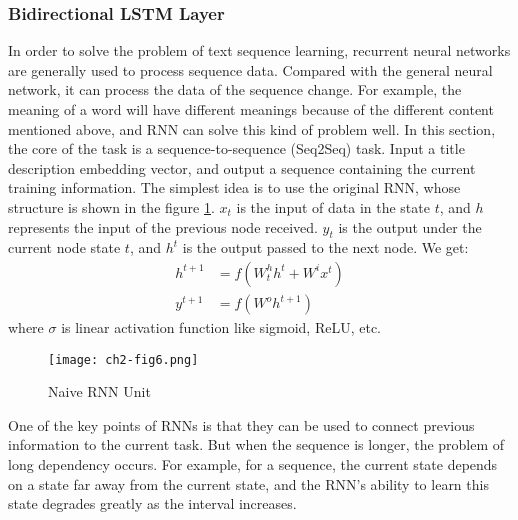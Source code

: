 \subsubsection{Bidirectional LSTM Layer}


In order to solve the problem of text sequence learning, recurrent neural networks are generally used to process sequence data. Compared with the general neural network, it can process the data of the sequence change. For example, the meaning of a word will have different meanings because of the different content mentioned above, and RNN can solve this kind of problem well. In this section, the core of the task is a sequence-to-sequence (Seq2Seq) task. Input a title description embedding vector, and output a sequence containing the current training information. The simplest idea is to use the original RNN, whose structure is shown in the figure \ref{ch2-fig6}. $x_t$ is the input of data in the state $t$, and $h$ represents the input of the previous node received. $y_t$ is the output under the current node state $t$, and $h^{t}$ is the output passed to the next node. We get: 
\begin{align}
	h^{t+1}&=f(W^h_{t} h^t+W^i x^t)\\
	y^{t+1}&=f(W^o h^{t+1})
\end{align}
where $\sigma$ is linear activation function like sigmoid, ReLU, etc.

\begin{figure}[h]
	\centering
	\texttt{[image: ch2-fig6.png]}
	\caption{Naive RNN Unit}
	\label{ch2-fig6}
\end{figure}

One of the key points of RNNs is that they can be used to connect previous information to the current task. But when the sequence is longer, the problem of long dependency occurs. For example, for a sequence, the current state depends on a state far away from the current state, and the RNN's ability to learn this state degrades greatly as the interval increases.

